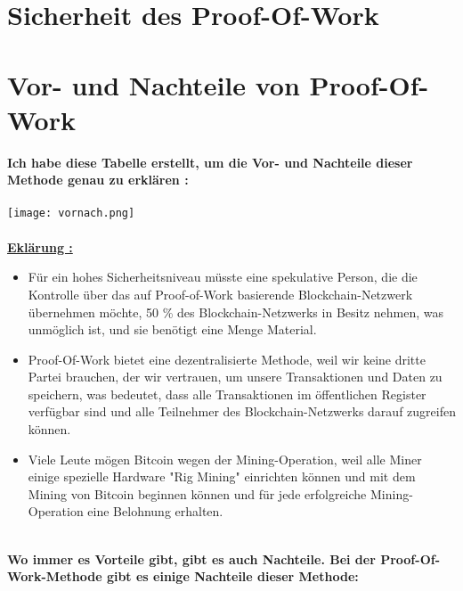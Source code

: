 \documentclass[ngerman]{scrreprt}
\begin{document}
\section{Sicherheit des Proof-Of-Work}
\newpage
\section{Vor- und Nachteile von Proof-Of-Work}
\textbf{Ich habe diese Tabelle erstellt, um die Vor- und Nachteile dieser Methode genau zu erklären : } \\ \\
\texttt{[image: vornach.png]} \\ \\
\textbf{\underline{Eklärung :}}
\begin{itemize}
	\item Für ein hohes Sicherheitsniveau müsste eine spekulative Person, die die Kontrolle über das auf Proof-of-Work basierende Blockchain-Netzwerk übernehmen möchte, 50 \% des
	Blockchain-Netzwerks in Besitz nehmen, was unmöglich ist, und sie benötigt eine Menge Material.
	\item Proof-Of-Work bietet eine dezentralisierte Methode, weil wir keine dritte Partei brauchen, der wir vertrauen, um unsere Transaktionen und Daten zu speichern, was bedeutet, dass alle Transaktionen im öffentlichen Register verfügbar sind und alle Teilnehmer des Blockchain-Netzwerks darauf zugreifen können.
	\item Viele Leute mögen Bitcoin wegen der Mining-Operation, weil alle Miner einige spezielle Hardware "Rig Mining" einrichten können und mit dem Mining von Bitcoin beginnen können und für jede erfolgreiche Mining-Operation eine Belohnung erhalten. \\  \\
\end{itemize}
\textbf{Wo immer es Vorteile gibt, gibt es auch Nachteile. Bei der Proof-Of-Work-Methode gibt es einige Nachteile dieser Methode: }
\end{document}

